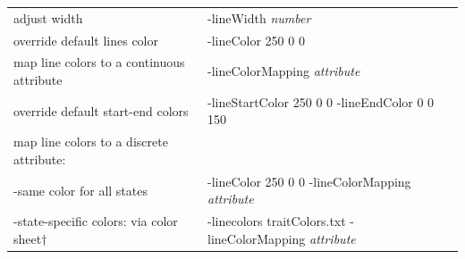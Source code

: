 \documentclass[english]{paper}
\begin{document}
\begin{table}
\begin{tabular}{ll}
adjust width						&	-lineWidth \textit{number}									\\
override default lines color				&	-lineColor 250 0 0										\\
map line colors to a continuous attribute	&	-lineColorMapping \textit{attribute}							\\
override default start-end colors		& 	-lineStartColor 250 0 0 -lineEndColor 0 0 150					\\
map line colors to a discrete attribute:	&														\\
	-same color for all states			&	-lineColor 250 0 0 -lineColorMapping \textit{attribute}				\\
	-state-specific colors: via color sheet$\dagger$&-linecolors traitColors.txt -lineColorMapping \textit{attribute}	\\


\end{tabular}
\end{table}
\end{document}
